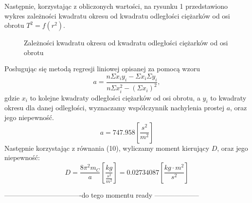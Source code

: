 \documentclass[10pt,a4paper]{article}
\newcommand{\forceindent}{\leavevmode{\parindent=3em\indent}}
\begin{document}
\forceindent Następnie, korzystając z obliczonych wartości, na rysunku 1 przedstawiono wykres zależności kwadratu okresu od kwadratu odległości ciężarków od osi obrotu $T^2 = f(r^2)$.

\begin{figure}[!h]
\centering
{}
\caption{Zależności kwadratu okresu od kwadratu odległości ciężarków od osi obrotu}
\label{fig:wyk}
\end{figure}

\forceindent Posługując się metodą regresji liniowej opisanej za pomocą wzoru 
\begin{equation}
a=\frac{n\Sigma x_i y_i - \Sigma x_i \Sigma y_i}{n\Sigma x_i^2 - (\Sigma x_i)^2},
\end{equation}
gdzie $x_i$ to kolejne kwadraty odległości ciężarków od osi obrotu, a $y_i$ to kwadraty okresu dla danej odległości, wyznaczamy współczynnik nachylenia prostej $a$, oraz jego niepewność. 
\begin{equation}
a = 747.958 \left[\frac{s^2}{m^2}\right]
\end{equation}
Następnie korzystając z równania (10), wyliczamy moment kierujący $D$, oraz jego niepewność:
\begin{equation}
D=\frac{8\pi^2m_{C}}{a} \left[\frac{kg}{\frac{s^2}{m^2}}\right] = 0.02734087 \left[\frac{kg\cdot m^2}{s^2}\right]
\end{equation}

----------------------------------do tego momentu ready --------------------\\
\end{document}

